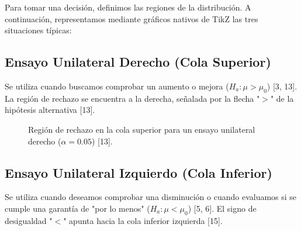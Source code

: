 \documentclass{article}
\begin{document}
Para tomar una decisión, definimos las regiones de la distribución. A continuación, representamos mediante gráficos nativos de TikZ las tres situaciones típicas:

\subsection{Ensayo Unilateral Derecho (Cola Superior)}
Se utiliza cuando buscamos comprobar un aumento o mejora ($H_a: \mu > \mu_0$) [3, 13]. La región de rechazo se encuentra a la derecha, señalada por la flecha "$>$" de la hipótesis alternativa [13].

\begin{figure}[h!]
\centering
{}
\caption{Región de rechazo en la cola superior para un ensayo unilateral derecho ($\alpha=0.05$) [13].}
\end{figure}

\subsection{Ensayo Unilateral Izquierdo (Cola Inferior)}
Se utiliza cuando deseamos comprobar una disminución o cuando evaluamos si se cumple una garantía de "por lo menos" ($H_a: \mu < \mu_0$) [5, 6]. El signo de desigualdad "$<$" apunta hacia la cola inferior izquierda [15].
\end{document}
